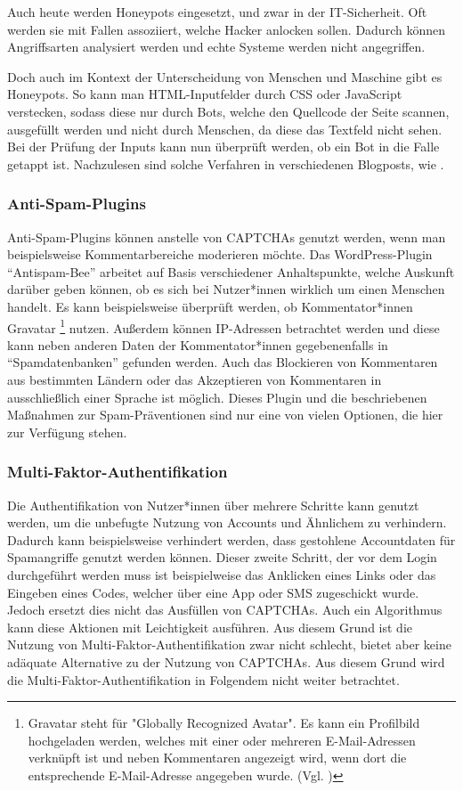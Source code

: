 Auch heute werden Honeypots eingesetzt, und zwar in der IT-Sicherheit. 
Oft werden sie mit Fallen assoziiert, welche Hacker anlocken sollen. 
Dadurch können Angriffsarten analysiert werden und echte Systeme werden nicht angegriffen.

Doch auch im Kontext der Unterscheidung von Menschen und Maschine gibt es Honeypots. 
So kann man HTML-Inputfelder durch CSS oder JavaScript verstecken, sodass diese nur durch Bots, welche den Quellcode der Seite scannen, ausgefüllt werden 
und nicht durch Menschen, da diese das Textfeld nicht sehen. 
Bei der Prüfung der Inputs kann nun überprüft werden, ob ein Bot in die Falle getappt ist. 
Nachzulesen sind solche Verfahren in verschiedenen Blogposts, wie \cite{perry:2019}.

\subsubsection*{Anti-Spam-Plugins}
Anti-Spam-Plugins können anstelle von CAPTCHAs genutzt werden, wenn man beispielsweise Kommentarbereiche moderieren möchte.
Das WordPress-Plugin ``Antispam-Bee'' arbeitet auf Basis verschiedener Anhaltspunkte, 
welche Auskunft darüber geben können, ob es sich bei Nutzer*innen wirklich um einen Menschen handelt.
Es kann beispielsweise überprüft werden, ob Kommentator*innen Gravatar
\footnote[3]{Gravatar steht für "Globally Recognized Avatar". 
Es kann ein Profilbild hochgeladen werden, welches mit einer oder mehreren E-Mail-Adressen verknüpft ist 
und neben Kommentaren angezeigt wird, wenn dort die entsprechende E-Mail-Adresse angegeben wurde. (Vgl. \cite{doku:antispambee})} nutzen.
Außerdem können IP-Adressen betrachtet werden und diese kann neben anderen Daten der Kommentator*innen gegebenenfalls in ``Spamdatenbanken'' gefunden werden.
Auch das Blockieren von Kommentaren aus bestimmten Ländern oder das Akzeptieren von Kommentaren in ausschließlich einer Sprache ist möglich.
Dieses Plugin und die beschriebenen Maßnahmen zur Spam-Präventionen sind nur eine von vielen Optionen, die hier zur Verfügung stehen.
\cite{blog:antispambee}
\cite{doku:antispambee}

\subsubsection*{Multi-Faktor-Authentifikation}
Die Authentifikation von Nutzer*innen über mehrere Schritte kann genutzt werden, um die unbefugte Nutzung von Accounts und Ähnlichem zu verhindern.
Dadurch kann beispielsweise verhindert werden, dass gestohlene Accountdaten für Spamangriffe genutzt werden können.
Dieser zweite Schritt, der vor dem Login durchgeführt werden muss ist beispielweise das Anklicken eines Links oder das Eingeben eines Codes,
welcher über eine App oder SMS zugeschickt wurde.
Jedoch ersetzt dies nicht das Ausfüllen von CAPTCHAs.
Auch ein Algorithmus kann diese Aktionen mit Leichtigkeit ausführen. 
Aus diesem Grund ist die Nutzung von Multi-Faktor-Authentifikation zwar nicht schlecht,
bietet aber keine adäquate Alternative zu der Nutzung von CAPTCHAs. 
Aus diesem Grund wird die Multi-Faktor-Authentifikation in Folgendem nicht weiter betrachtet.

